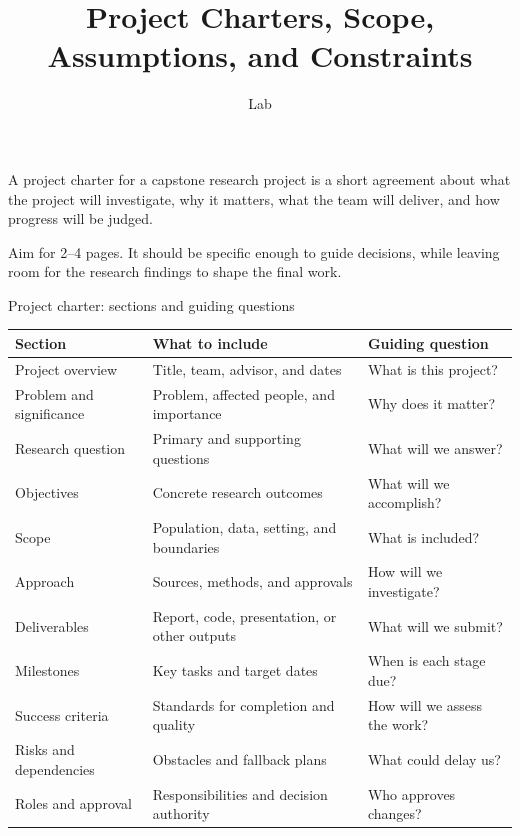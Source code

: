 \documentclass[aspectratio=43,11pt]{beamer}
\title{Project Charters, Scope, Assumptions, and Constraints}
\subtitle{Lab}
\author{}
\date{
\color{aggiemaroon}{
DAEN 459 - Fall 2026\\
\textbf{Alexander Abuabara}
}}
\begin{document}
\begin{frame}
\titlepage
\end{frame}

\begin{frame}
A project charter for a capstone research project is a short agreement about what the project will investigate, why it matters, what the team will deliver, and how progress will be judged.

\medskip
Aim for 2–4 pages. It should be specific enough to guide decisions, while leaving room for the research findings to shape the final work.
\end{frame}

\begin{frame}{Project charter: sections and guiding questions}
\tiny
\renewcommand{\arraystretch}{1.}
\begin{tabularx}{\textwidth}{@{}p{}X p{}@{}}
\hline
\textbf{Section} & \textbf{What to include} & \textbf{Guiding question} \\
\hline
Project overview & Title, team, advisor, and dates & What is this project? \\
Problem and significance & Problem, affected people, and importance & Why does it matter? \\
Research question & Primary and supporting questions & What will we answer? \\
Objectives & Concrete research outcomes & What will we accomplish? \\
Scope & Population, data, setting, and boundaries & What is included? \\
Approach & Sources, methods, and approvals & How will we investigate? \\
Deliverables & Report, code, presentation, or other outputs & What will we submit? \\
Milestones & Key tasks and target dates & When is each stage due? \\
Success criteria & Standards for completion and quality & How will we assess the work? \\
Risks and dependencies & Obstacles and fallback plans & What could delay us? \\
Roles and approval & Responsibilities and decision authority & Who approves changes? \\
\hline
\end{tabularx}
\vfill
\end{frame}
\end{document}
